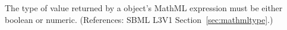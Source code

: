 The type of value returned by a \FunctionDefinition object's 
MathML expression must be either boolean or numeric.  (References: SBML
L3V1 Section~\ref{sec:mathmltype}.)
